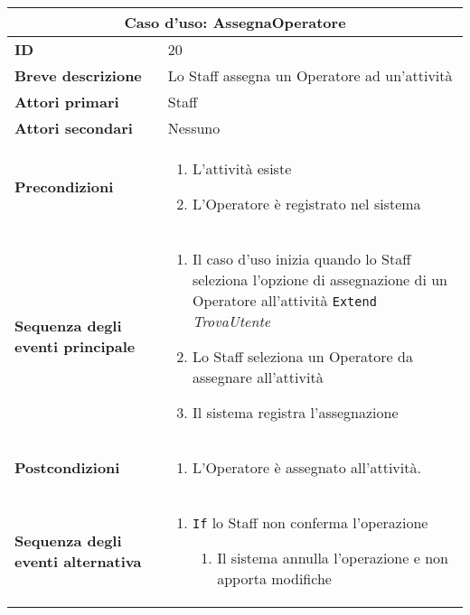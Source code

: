 \documentclass[a4paper]{report}
\begin{document}
\clearpage
\begin{table}[H]
\vspace*{-0cm}
\renewcommand{\arraystretch}{1.9}
\begin{tabular}{|p{3.9cm}|p{9.9cm}|}
\hline
\multicolumn{2}{|c|}{\textbf{Caso d’uso: AssegnaOperatore}} \\ \hline
	\textbf{ID} & 20 \\ \hline
	\textbf{Breve descrizione} & Lo Staff assegna un Operatore ad un’attività \\ \hline
	\textbf{Attori primari} & Staff \\ \hline
	\textbf{Attori secondari} & Nessuno \\ \hline
	\textbf{Precondizioni} & \begin{enumerate}[leftmargin=14pt,label=\arabic*.,labelsep=0.5em,topsep=0pt,partopsep=0pt,parsep=0pt,itemsep=0pt]
    \item L’attività esiste
    \item L’Operatore è registrato nel sistema
\end{enumerate} \\ \hline
	\textbf{Sequenza degli eventi principale} & \begin{enumerate}[leftmargin=14pt,label=\arabic*.,labelsep=0.5em,topsep=0pt,partopsep=0pt,parsep=0pt,itemsep=0pt]
    \item Il caso d'uso inizia quando lo Staff seleziona l'opzione di assegnazione di un Operatore all'attività
    \newline \texttt{Extend} \textit{TrovaUtente}
    \item Lo Staff seleziona un Operatore da assegnare all'attività
    \item Il sistema registra l’assegnazione
\end{enumerate} \\ \hline
	\textbf{Postcondizioni} & \begin{enumerate}[label=\arabic*.,leftmargin=14pt,labelsep=0.5em,topsep=0pt,partopsep=0pt,parsep=0pt,itemsep=0pt]
        \item L’Operatore è assegnato all’attività.
    \end{enumerate} \\ \hline
	\textbf{Sequenza degli eventi alternativa} & \begin{enumerate}[leftmargin=14pt,label=\arabic*.,labelsep=0.5em,topsep=0pt,partopsep=0pt,parsep=0pt,itemsep=0pt]
    \item \texttt{If} lo Staff non conferma l’operazione
    \begin{enumerate}[label=\arabic{enumi}.\arabic*.,leftmargin=22pt,labelsep=0.5em,topsep=0pt,partopsep=0pt,parsep=0pt,itemsep=0pt]
        \item Il sistema annulla l’operazione e non apporta modifiche
    \end{enumerate}
\end{enumerate} \\ \hline
\end{tabular}
\end{table}
\end{document}
